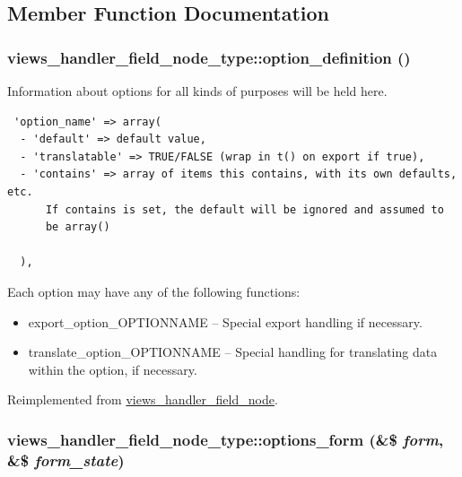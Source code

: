 \subsection{Member Function Documentation}
\hypertarget{classviews__handler__field__node__type_4e50103a014bff96644915cb0c8d33fd}{
\subsubsection[{option\_\-definition}]{\setlength{\rightskip}{0pt plus 5cm}views\_\-handler\_\-field\_\-node\_\-type::option\_\-definition ()}}
\label{classviews__handler__field__node__type_4e50103a014bff96644915cb0c8d33fd}


Information about options for all kinds of purposes will be held here. 

\begin{Code}\begin{verbatim} 'option_name' => array(
  - 'default' => default value,
  - 'translatable' => TRUE/FALSE (wrap in t() on export if true),
  - 'contains' => array of items this contains, with its own defaults, etc.
      If contains is set, the default will be ignored and assumed to
      be array()

  ),
\end{verbatim}
\end{Code}

 Each option may have any of the following functions:\begin{itemize}
\item export\_\-option\_\-OPTIONNAME -- Special export handling if necessary.\item translate\_\-option\_\-OPTIONNAME -- Special handling for translating data within the option, if necessary. \end{itemize}


Reimplemented from \hyperlink{classviews__handler__field__node_c2daf04495ea792ad0dd60c864f3a77e}{views\_\-handler\_\-field\_\-node}.\hypertarget{classviews__handler__field__node__type_0152124a453b32265e512bace19d6de4}{
\subsubsection[{options\_\-form}]{\setlength{\rightskip}{0pt plus 5cm}views\_\-handler\_\-field\_\-node\_\-type::options\_\-form (\&\$ {\em form}, \/  \&\$ {\em form\_\-state})}}
\label{classviews__handler__field__node__type_0152124a453b32265e512bace19d6de4}


